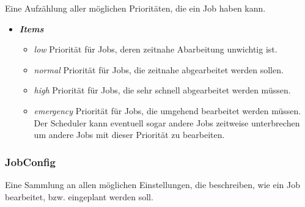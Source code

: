\documentclass[a4paper,12pt]{article}
\begin{document}
Eine Aufzählung aller möglichen Prioritäten, die ein Job haben kann.
\begin{itemize}[label={}]
	\item \textit{\textbf{Items}}
		\begin{itemize}[label={\textbullet}]
			\item \textit{low} Priorität für Jobs, deren zeitnahe Abarbeitung unwichtig ist.
			\item \textit{normal} Priorität für Jobs, die zeitnahe abgearbeitet werden sollen.
			\item \textit{high} Priorität für Jobs, die sehr schnell abgearbeitet werden müssen.
			\item \textit{emergency} Priorität für Jobs, die umgehend bearbeitet werden müssen. Der Scheduler kann eventuell sogar andere Jobs zeitweise unterbrechen um andere Jobs mit dieser Priorität zu bearbeiten.
		\end{itemize}
\end{itemize}

\subsubsection{JobConfig}

Eine Sammlung an allen möglichen Einstellungen, die beschreiben, wie ein Job bearbeitet, bzw. eingeplant werden soll.
\end{document}
